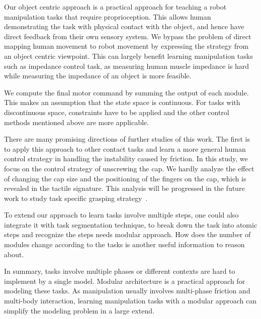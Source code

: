 Our object centric approach is a practical approach for teaching a robot manipulation tasks that require proprioception. This allows human demonstrating the task with physical contact with the object, and hence have direct feedback from their own sensory system. We bypass the problem of direct mapping human movement to robot movement by expressing the strategy from an object centric viewpoint. This can largely benefit learning manipulation tasks such as impedance control task, as measuring human muscle impedance is hard while measuring the impedance of an object is more feasible.

We compute the final motor command by summing the output of each module. This makes an assumption that the state space is continuous. For tasks with discontinuous space, constraints have to be applied and the other control methods mentioned above are more applicable.

There are many promising directions of further studies of this work. The first is to apply this approach to other contact tasks and learn a more general human control strategy in handling the instability caused by friction.
In this study, we focus on the control strategy of unscrewing the cap. We hardly analyze the effect of changing the cap size and the positioning of the fingers on the cap, which is revealed in the tactile signature. This analysis will be progressed in the future work to study task specific grasping strategy~\citep{el2013generation,dang2014semantic}.

To extend our approach to learn tasks involve multiple steps, one could also integrate it with task segmentation technique, to break down the task into atomic steps and recognize the steps needs modular approach. How does the number of modules change according to the tasks is another useful information to reason about.


In summary, tasks involve multiple phases or different contexts are hard to implement by a single model. Modular architecture is a practical approach for modeling these tasks. As manipulation usually involves multi-phase friction and multi-body interaction, learning manipulation tasks with a modular approach can simplify the modeling problem in a large extend.



